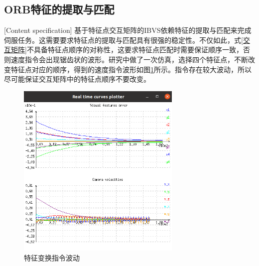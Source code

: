 \documentclass[fontset=fandol,type=bachelor,campus=harbin]{hithesisbook}
\begin{document}
\subsection{ORB特征的提取与匹配}[Content specification]
基于特征点交互矩阵的IBVS依赖特征的提取与匹配来完成伺服任务。这需要要求特征点的提取与匹配具有很强的稳定性。不仅如此，式\ref{交互矩阵}不具备特征点顺序的对称性，这要求特征点匹配时需要保证顺序一致，否则速度指令会出现锯齿状的波形。研究中做了一次仿真，选择四个特征点，不断改变特征点对应的顺序，得到的速度指令波形如图\ref{特征变换指令波动}所示。指令存在较大波动，所以尽可能保证交互矩阵中的特征点顺序不要改变。
\begin{figure}[h]
\centering
\includegraphics[width = 0.7\textwidth]{chapter4/特征变换指令波动}
\caption{特征变换指令波动}
\label{特征变换指令波动}
\end{figure}
\end{document}
